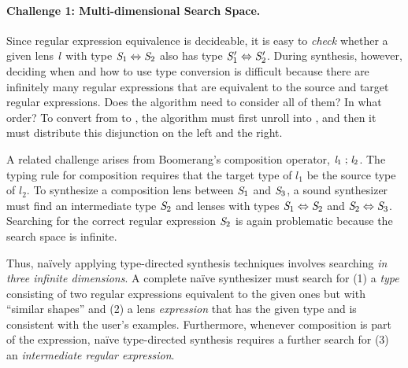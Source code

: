 \documentclass[acmsmall]{acmart}
\begin{document}
\paragraph*{Challenge 1: Multi-dimensional Search Space.}
Since regular expression equivalence is decideable, 
it is easy to \emph{check} whether a given lens $\mathit{l}$ with type 
$\mathit{S}_1 \Leftrightarrow \mathit{S}_2$
also has type 
$\mathit{S}_1' \Leftrightarrow \mathit{S}_2'$. 
%
During synthesis, however, deciding when and how to use type conversion is
difficult because there are infinitely many regular expressions that are
equivalent to the source and target regular expressions.  Does the algorithm
need to consider all of them?  In what order?  To convert from
 to ,
the algorithm must first unroll  into
, and then it must
distribute this disjunction on the left and the right.

A related challenge arises from Boomerang's composition operator,
$\mathit{l}_1\mathrel{;}\mathit{l}_2$.  The typing rule for composition
requires that the target type of $l_1$ be the source
type of $l_2$.  To synthesize a composition lens between
$\mathit{S}_1$ and $\mathit{S}_3$, a sound synthesizer must find an intermediate type
$\mathit{S}_2$ and lenses with types $\mathit{S}_1 \Leftrightarrow \mathit{S}_2$ and
$\mathit{S}_2 \Leftrightarrow \mathit{S}_3$.  Searching for the correct
regular expression $\mathit{S}_2$ is again problematic because
the search space is infinite.   



Thus, na\"{i}vely applying type-directed synthesis techniques
involves searching \emph{in three infinite dimensions}.  A complete na\"{i}ve
synthesizer must search for
(1) a \emph{type} consisting of two regular expressions equivalent to the
given ones but with ``similar shapes'' and
(2) a lens \emph{expression} that has the given type and is consistent
with the user's examples.
Furthermore, whenever composition is part of the
expression, na\"{i}ve type-directed synthesis requires a further search for
(3) an {\em intermediate regular expression}.
\end{document}
